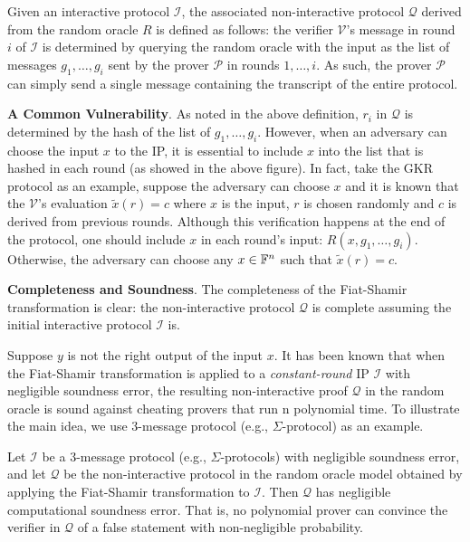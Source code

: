 \documentclass{article}
\begin{document}
\begin{boxx1} \label{def:fiat-shamir}
Given an interactive protocol $\mathcal{I}$, the associated non-interactive protocol $\mathcal{Q}$ derived from the random oracle $R$ is defined as follows: the verifier $\mathcal{V}$'s message in round $i$ of $\mathcal{I}$ is determined by querying the random oracle with the input as the list of messages $g_1, \dots, g_i$ sent by the prover $\mathcal{P}$ in rounds $1, \dots, i$. As such, the prover $\mathcal{P}$ can simply send a single message containing the transcript of the entire protocol.
\end{boxx1}

\textbf{A Common Vulnerability}. As noted in the above definition, $r_i$ in $\mathcal{Q}$ is determined by the hash of the list of $g_1, \dots, g_i$. However, when an adversary can choose the input $x$ to the IP, it is essential to include $x$ into the list that is hashed in each round (as showed in the above figure). In fact, take the GKR protocol as an example, suppose the adversary can choose $x$ and it is known that the $\mathcal{V}$'s evaluation $\widetilde{x}(r) = c$ where $x$ is the input, $r$ is chosen randomly and $c$ is derived from previous rounds. Although this verification happens at the end of the protocol, one should include $x$ in each round's input: $R(x, g_1, \dots, g_i)$. Otherwise, the adversary can choose any $x \in \mathbb{F}^n$ such that $\widetilde{x}(r) = c$.

\textbf{Completeness and Soundness}. The completeness of the Fiat-Shamir transformation is clear: the non-interactive protocol $\mathcal{Q}$ is complete assuming the initial interactive protocol $\mathcal{I}$ is.

Suppose $y$ is not the right output of the input $x$. It has been known that when the Fiat-Shamir transformation is applied to a \textit{constant-round} IP $\mathcal{I}$ with negligible soundness error, the resulting non-interactive proof $\mathcal{Q}$ in the random oracle is sound against cheating provers that run n polynomial time. To illustrate the main idea, we use $3$-message protocol (e.g.,  $\Sigma$-protocol) as an example. 


\begin{boxx3}
Let $\mathcal{I}$ be a $3$-message protocol (e.g., $\Sigma$-protocols) with negligible soundness error, and let $\mathcal{Q}$ be the non-interactive protocol in the random oracle model obtained by applying the Fiat-Shamir transformation to $\mathcal{I}$. Then $\mathcal{Q}$ has negligible computational soundness error. That is, no polynomial prover can convince the verifier in $\mathcal{Q}$ of a false statement with non-negligible probability.
\end{boxx3}
\end{document}
